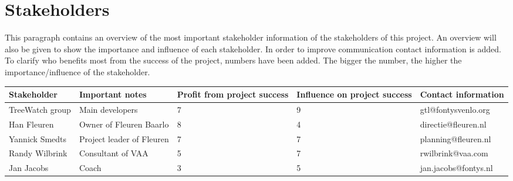 \section{Stakeholders}

This paragraph contains an overview of the most important stakeholder information of the stakeholders of this project. An overview will also be given to show the importance and influence of each stakeholder. In order to improve communication contact information is added. To clarify who benefits most from the success of the project, numbers have been added. The bigger the number, the higher the importance/influence of the stakeholder.

\begin{tabular}{| p{} | p{3cm} | p{} | p{} | p{} |}
	\hline
	Stakeholder & Important notes & Profit from project success & Influence on project success & Contact information \\
	\hline
	TreeWatch group & Main developers & 7 & 9 & gtl@fontysvenlo.org \\
	\hline
	Han Fleuren & Owner of Fleuren Baarlo & 8 & 4 & directie@fleuren.nl \\
	\hline
	Yannick Smedts & Project leader of Fleuren & 7 & 7 & planning@fleuren.nl \\
	\hline
	Randy Wilbrink & Consultant of VAA & 5 & 7 & rwilbrink@vaa.com \\
	\hline
	Jan Jacobs & Coach & 3 & 5 & jan.jacobs@fontys.nl \\
	\hline
\end{tabular}